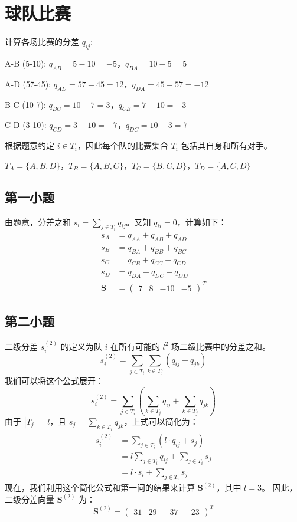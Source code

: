 \documentclass{ctexart}
\renewcommand{\S}{\mathbf{S}}
\begin{document}
\section{球队比赛}
计算各场比赛的分差 $q_{ij}$:

A-B (5-10): $q_{AB} = 5 - 10 = -5$，$q_{BA} = 10 - 5 = 5$

A-D (57-45): $q_{AD} = 57 - 45 = 12$，$q_{DA} = 45 - 57 = -12$

B-C (10-7): $q_{BC} = 10 - 7 = 3$，$q_{CB} = 7 - 10 = -3$

C-D (3-10): $q_{CD} = 3 - 10 = -7$，$q_{DC} = 10 - 3 = 7$

根据题意约定 $i \in T_i$，因此每个队的比赛集合 $T_i$ 包括其自身和所有对手。

$T_A = \{A, B, D\}$，$T_B = \{A, B, C\}$，$T_C = \{B, C, D\}$，$T_D = \{A, C, D\}$
\subsection{第一小题}
由题意，分差之和 $s_i = \sum_{j \in T_i}q_{ij}$。又知 $q_{ii}=0$，计算如下：
\begin{align*}
    s_A &= q_{AA} + q_{AB} + q_{AD}\\
    s_B &= q_{BA} + q_{BB} + q_{BC}\\
    s_C &= q_{CB} + q_{CC} + q_{CD}\\
    s_D &= q_{DA} + q_{DC} + q_{DD}\\
    \S &= \begin{pmatrix}
        7&8&-10&-5
    \end{pmatrix}^T
\end{align*}
\subsection{第二小题}
二级分差 $s_i^{(2)}$ 的定义为队 $i$ 在所有可能的 $l^2$ 场二级比赛中的分差之和。
\[
s_i^{(2)} = \sum_{j \in T_i} \sum_{k \in T_j} (q_{ij} + q_{jk})
\]
我们可以将这个公式展开：
\[
s_i^{(2)} = \sum_{j \in T_i} \left( \sum_{k \in T_j} q_{ij} + \sum_{k \in T_j} q_{jk} \right)
\]
由于 $|T_j| = l$，且 $s_j = \sum_{k \in T_j} q_{jk}$，上式可以简化为：
\begin{align*}
s_i^{(2)} &= \sum_{j \in T_i} (l \cdot q_{ij} + s_j) \\
          &= l \sum_{j \in T_i} q_{ij} + \sum_{j \in T_i} s_j \\
          &= l \cdot s_i + \sum_{j \in T_i} s_j
\end{align*}
现在，我们利用这个简化公式和第一问的结果来计算 $\S^{(2)}$，其中 $l=3$。
因此，二级分差向量 $\S^{(2)}$ 为：
\[
\S^{(2)} = \begin{pmatrix} 31 & 29 & -37 & -23 \end{pmatrix}^T
\]
\end{document}

